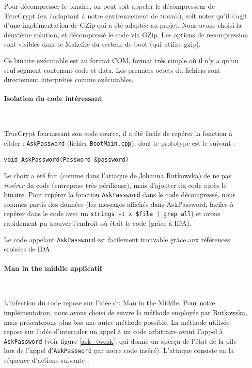 \documentclass[12pt,a4paper]{article}
\begin{document}
Pour décompresser le binaire, on peut soit appeler le décompresseur de
TrueCrypt (en l'adaptant à notre environnement de travail), soit noter qu'il
s'agit d'une implémentation de GZip qui a été adaptée au projet. Nous avons
choisi la deuxième solution, et décompressé le code via GZip. Les options de
recompression sont visibles dans le Makefile du secteur de boot (qui utilise
gzip).

Ce binaire exécutable est au format COM, format très simple où il n'y a qu'un
seul segment contenant code et data. Les premiers octets du fichiers sont
directement interprétés comme exécutables.

\paragraph{Isolation du code intéressant}~

TrueCrypt fournissant son code source, il a été facile de repérer la fonction à
cibler : \texttt{AskPassword} (fichier \texttt{BootMain.cpp}), dont le
prototype est le suivant :

\begin{center}
    \texttt{void AskPassword(Password \&password)}
\end{center}

Le choix a été fait (comme dans l'attaque de Johanna Rutkowska) de ne pas
\textit{insérer} du code (entreprise très périlleuse), mais d'ajouter du code
après le binaire. Pour repérer la fonction \texttt{AskPassword} dans le code
décompressé, nous sommes partis des données (les messages affichés dans
AskPassword, faciles à repérer dans le code avec un \texttt{strings -t x \$file
| grep all}) et avons rapidement pu trouver l'endroit où était le code (grâce à
IDA).

Le code appelant \texttt{AskPassword} est facilement trouvable grâce aux
références croisées de IDA.

\paragraph{Man in the middle applicatif}~

L'infection du code repose sur l'idée du Man in the Middle. Pour notre
implémentation, nous avons choisi de suivre la méthode employée par Rutkowska,
mais présenterons plus bas une autre méthode possible. La méthode utilisée
repose sur l'idée d'intercaler un appel à un code arbitraire avant l'appel à 
\texttt{AskPassword} (voir figure \ref{ask_tweak}, qui donne un aperçu de l'état
de la pile lors de l'appel d'\texttt{AskPassword} par notre code inséré).
L'attaque consiste en la séquence d'actions suivante :
\end{document}
